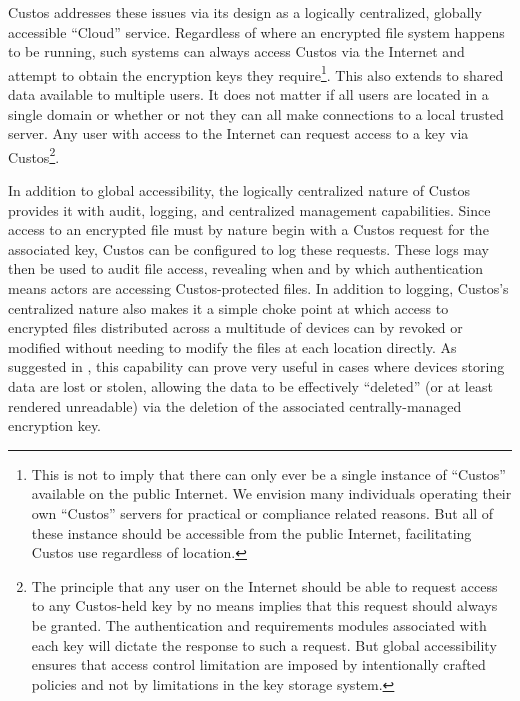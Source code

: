 Custos addresses these issues via its design as a logically
centralized, globally accessible ``Cloud'' service. Regardless of
where an encrypted file system happens to be running, such systems can
always access Custos via the Internet and attempt to obtain the
encryption keys they require\footnote{This is not to imply that there
  can only ever be a single instance of ``Custos'' available on the
  public Internet. We envision many individuals operating their own
  ``Custos'' servers for practical or compliance related reasons. But
  all of these instance should be accessible from the public Internet,
  facilitating Custos use regardless of location.}. This also extends
to shared data available to multiple users. It does not matter if all
users are located in a single domain or whether or not they can all
make connections to a local trusted server. Any user with access to
the Internet can request access to a key via Custos\footnote{The
  principle that any user on the Internet should be able to request
  access to any Custos-held key by no means implies that this request
  should always be granted. The authentication and requirements
  modules associated with each key will dictate the response to such a
  request. But global accessibility ensures that access control
  limitation are imposed by intentionally crafted policies and not by
  limitations in the key storage system.}.

In addition to global accessibility, the logically centralized nature
of Custos provides it with audit, logging, and centralized management
capabilities. Since access to an encrypted file must by nature begin
with a Custos request for the associated key, Custos can be configured
to log these requests. These logs may then be used to audit file
access, revealing when and by which authentication means actors are
accessing Custos-protected files. In addition to logging, Custos's
centralized nature also makes it a simple choke point at which access
to encrypted files distributed across a multitude of devices can by
revoked or modified without needing to modify the files at each
location directly. As suggested in \cite{Geambasu2011}, this
capability can prove very useful in cases where devices storing data
are lost or stolen, allowing the data to be effectively ``deleted''
(or at least rendered unreadable) via the deletion of the associated
centrally-managed encryption key.

